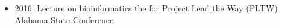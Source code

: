 \begin{itemize}
    \item 2016. Lecture on bioinformatics the for Project Lead the Way (PLTW)
        Alabama State Conference
\end{itemize}
